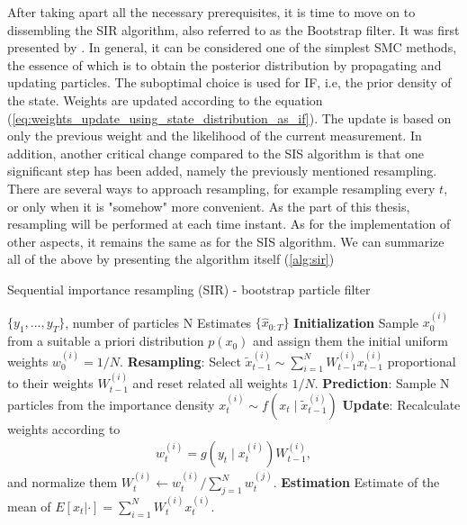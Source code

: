 After taking apart all the necessary prerequisites, it is time to move on to dissembling the SIR algorithm, also referred to as the Bootstrap filter. It was first presented by \cite{gordon_novel_1993}. In general, it can be considered one of the simplest SMC methods, the essence of which is to obtain the posterior distribution by propagating and updating particles.
The suboptimal choice is used for  IF, i.e, the prior density of the state. Weights are updated according to the equation (\ref{eq:weights_update_using_state_distribution_as_if}). The update is based on only the previous weight and the likelihood of the current measurement. In addition, another critical change compared to the SIS algorithm is that one significant step has been added, namely the previously mentioned resampling. There are several ways to approach resampling, for example resampling every \(t\), or only when it is "somehow" more convenient. As the part of this thesis, resampling will be performed at each time instant. As for the implementation of other aspects, it remains the same as for the SIS algorithm. We can summarize all of the above by presenting the algorithm itself (\ref{alg:sir})

\begin{algorithm}
    \caption{Sequential importance resampling (SIR) - bootstrap particle filter}
  \begin{algorithmic}[1]
    \INPUT \(\{y_1, . . . , y_T\}\), number of particles N
    \OUTPUT Estimates \(\{\hat{x}_{0:T}\}\)
    \STATE \textbf{Initialization} Sample \(x_0^{(i)}\) from a suitable a priori distribution \(p(x_0)\) and assign them the initial uniform weights \(w_0^{(i)} = 1/N\).
      \STATE \textbf{Resampling}: Select \(\tilde{x}_{t-1}^{(i)}\sim \sum_{i=1}^N W_{t-1}^{(i)} x_{t-1}^{(i)}\) proportional to their weights \(W_{t-1}^{(i)}\) and reset related all weights \(1/N\).
      \STATE \textbf{Prediction}: Sample N particles from the importance density \(x_t^{(i)} \sim f\left(x_t \mid \tilde{x}_{t-1}^{(i)}\right)\)
      \STATE \textbf{Update}: Recalculate weights according to
        $$
        \begin{aligned}
        w_t^{(i)}= g\left(y_t \mid x_t^{(i)}\right) W_{t-1}^{(i)},
        \end{aligned}
        $$
        and normalize them \(W_t^{(i)} \leftarrow w_t^{(i)}/\sum_{j=1}^N w_t^{(j)}\).
    \STATE \textbf{Estimation} Estimate of the mean of \(E[x_t|\cdot] = \sum_{i=1}^{N}W_{t}^{(i)} x_t^{(i)}\).
    \ENDFOR
  \end{algorithmic}
  \label{alg:sir}
\end{algorithm}

